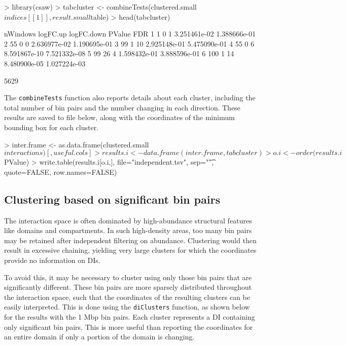 \documentclass[12pt]{report}
\renewenvironment{Schunk}{\vspace{0pt}}{\vspace{0pt}}
\newcommand{\code}[1]{{\small\texttt{#1}}}
\begin{document}
\begin{Schunk}
\begin{Sinput}
> library(csaw)
> tabcluster <- combineTests(clustered.small$indices[[1]], result.small$table)
> head(tabcluster)
\end{Sinput}
\begin{Soutput}
  nWindows logFC.up logFC.down       PValue          FDR
1        1        0          1 3.251461e-02 1.388666e-01
2       55        0          0 2.636977e-02 1.190695e-01
3       99        1         10 2.925148e-01 5.475090e-01
4       55        0          6 8.591867e-10 7.521332e-08
5       99       26          4 1.598432e-01 3.888596e-01
6      100        1         14 8.480900e-05 1.027224e-03
\end{Soutput}
\begin{Soutput}
[1] 5629
\end{Soutput}
\end{Schunk}

The \code{combineTests} function also reports details about each cluster, including the total number of bin pairs and the number changing in each direction.
These results are saved to file below, along with the coordinates of the minimum bounding box for each cluster.

\begin{Schunk}
\begin{Sinput}
> inter.frame <- as.data.frame(clustered.small$interactions)[,useful.cols]
> results.i <- data.frame(inter.frame, tabcluster)
> o.i <- order(results.i$PValue)
> write.table(results.i[o.i,], file="independent.tsv", sep="\t", quote=FALSE, row.names=FALSE)
\end{Sinput}
\end{Schunk}

\subsection{Clustering based on significant bin pairs}
\label{sec:sigclust}
The interaction space is often dominated by high-abundance structural features like domains and compartments. 
In such high-density areas, too many bin pairs may be retained after independent filtering on abundance.
Clustering would then result in excessive chaining, yielding very large clusters for which the coordinates provide no information on DIs.

To avoid this, it may be necessary to cluster using only those bin pairs that are significantly different.
These bin pairs are more sparsely distributed throughout the interaction space, such that the coordinates of the resulting clusters can be easily interpreted.
This is done using the \code{diClusters} function, as shown below for the results with the 1 Mbp bin pairs.
Each cluster represents a DI containing only significant bin pairs.
This is more useful than reporting the coordinates for an entire domain if only a portion of the domain is changing.
\end{document}
